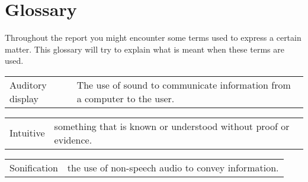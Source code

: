 
\section*{Glossary} %
\label{sec:glossary}

Throughout the report you might encounter some terms used to express a certain matter. 
This glossary will try to explain what is meant when these terms are used.

\begin{table}[!h]

\begin{tabular}{p{2in} p{3.4in}}
Auditory display & The use of sound to communicate information from a computer to the user.
\end{tabular}

\begin{tabular}{p{2in} p{3.4in}}
Intuitive & something that is known or understood without proof or evidence.
\end{tabular}

\begin{tabular}{p{2in} p{3.4in}}
Sonification & the use of non-speech audio to convey information.
\end{tabular}

\end{table}


